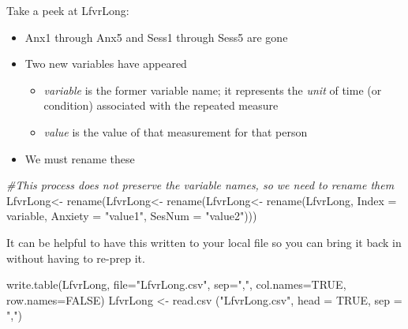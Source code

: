 \documentclass[
  english,
]{book}
\newenvironment{Shaded}{\begin{snugshade}}{\end{snugshade}}
\newcommand{\AttributeTok}[1]{\textcolor[rgb]{0.77,0.63,0.00}{#1}}
\newcommand{\CommentTok}[1]{\textcolor[rgb]{0.56,0.35,0.01}{\textit{#1}}}
\newcommand{\ConstantTok}[1]{\textcolor[rgb]{0.00,0.00,0.00}{#1}}
\newcommand{\FunctionTok}[1]{\textcolor[rgb]{0.00,0.00,0.00}{#1}}
\newcommand{\NormalTok}[1]{#1}
\newcommand{\OtherTok}[1]{\textcolor[rgb]{0.56,0.35,0.01}{#1}}
\newcommand{\StringTok}[1]{\textcolor[rgb]{0.31,0.60,0.02}{#1}}
\providecommand{\tightlist}{%
  \setlength{\itemsep}{0pt}\setlength{\parskip}{0pt}}
\begin{document}
Take a peek at LfvrLong:

\begin{itemize}
\tightlist
\item
  Anx1 through Anx5 and Sess1 through Sess5 are gone
\item
  Two new variables have appeared

  \begin{itemize}
  \tightlist
  \item
    \emph{variable} is the former variable name; it represents the \emph{unit} of time (or condition) associated with the repeated measure
  \item
    \emph{value} is the value of that measurement for that person
  \end{itemize}
\item
  We must rename these
\end{itemize}

\begin{Shaded}
\begin{Highlighting}[]
\CommentTok{\#This process  does not preserve the variable names, so we need to rename them}
\NormalTok{LfvrLong}\OtherTok{\textless{}{-}}  \FunctionTok{rename}\NormalTok{(LfvrLong}\OtherTok{\textless{}{-}}  \FunctionTok{rename}\NormalTok{(LfvrLong}\OtherTok{\textless{}{-}}  \FunctionTok{rename}\NormalTok{(LfvrLong, }\AttributeTok{Index =}\NormalTok{ variable, }\AttributeTok{Anxiety =} \StringTok{"value1"}\NormalTok{, }\AttributeTok{SesNum =} \StringTok{"value2"}\NormalTok{)))}
\end{Highlighting}
\end{Shaded}

It can be helpful to have this written to your local file so you can bring it back in without having to re-prep it.

\begin{Shaded}
\begin{Highlighting}[]
\FunctionTok{write.table}\NormalTok{(LfvrLong, }\AttributeTok{file=}\StringTok{"LfvrLong.csv"}\NormalTok{, }\AttributeTok{sep=}\StringTok{","}\NormalTok{, }\AttributeTok{col.names=}\ConstantTok{TRUE}\NormalTok{, }\AttributeTok{row.names=}\ConstantTok{FALSE}\NormalTok{)}
\NormalTok{LfvrLong }\OtherTok{\textless{}{-}} \FunctionTok{read.csv}\NormalTok{ (}\StringTok{"LfvrLong.csv"}\NormalTok{, }\AttributeTok{head =} \ConstantTok{TRUE}\NormalTok{, }\AttributeTok{sep =} \StringTok{","}\NormalTok{)}
\end{Highlighting}
\end{Shaded}
\end{document}
